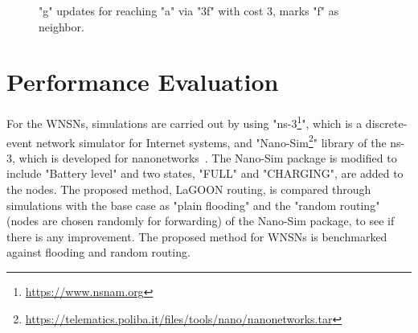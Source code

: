 \documentclass[12pt, oneandhalf, chaparabic, sees, ms]{metu}
\begin{document}
\begin{center}
\begin{figure}[!htp]
\begin{center}
   \end{center}
    \caption{"g" updates for reaching "a" via "3f" with cost 3, marks "f" as neighbor.}
    \label{fig:lagoon-graph9d}
  \end{figure}
\end{center}
% 
% 
% 
% 
% 
% 
\vspace{10cm}
\newpage
\section{Performance Evaluation}\label{sperf}
For the WNSNs, simulations are carried out by using "ns-3\footnote{\url{https://www.nsnam.org}}", which is a discrete-event network simulator for Internet systems, 
and "Nano-Sim\footnote{\url{https://telematics.poliba.it/files/tools/nano/nanonetworks.tar}}" library of the ns-3, which is developed for
nanonetworks~\cite{piroNS32013, piroPA2013}. The Nano-Sim package is modified to include "Battery level" and two states, "FULL" and "CHARGING", are added to the nodes. 
The proposed method, LaGOON routing, is compared through simulations with the base case as "plain flooding" and the "random routing" (nodes are chosen randomly for forwarding) of the Nano-Sim package, to see if there is any improvement. 
%
%
%
%
The proposed method for WNSNs is benchmarked against flooding and random routing.
\end{document}
